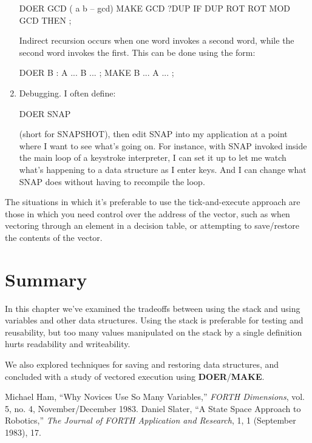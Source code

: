\begin{enumerate}
\begin{Code}
DOER GCD ( a b -- gcd)
MAKE GCD  ?DUP  IF  DUP ROT ROT  MOD  GCD  THEN ;
\end{Code}
Indirect recursion occurs when one word invokes a second word, while the
second word invokes the first. This can be done using the form:

\begin{Code}
DOER B
: A  ... B ... ;
MAKE B  ... A ... ;
\end{Code}
\item Debugging. I often define:

\begin{Code}
DOER SNAP
\end{Code}
(short for SNAPSHOT), then edit SNAP into my application at a point
where I want to see what's going on. For instance, with SNAP invoked inside
the main loop of a keystroke interpreter, I can set it up to let me watch
what's happening to a data structure as I enter keys. And I can change
what SNAP does without having to recompile the loop.
\end{enumerate}


The situations in which it's preferable to use the tick-and-execute approach
are those in which you need control over the address of the vector,
such as when vectoring through an element in a decision table, or
attempting to save/restore the contents of the vector.

\section{Summary}
In this chapter we've examined the tradeoffs between using the stack
and using variables and other data structures. Using the stack is
preferable for testing and reusability, but too many values manipulated
on the stack by a single definition hurts readability and writeability.

We also explored techniques for saving and restoring data structures,
and concluded with a study of vectored execution using \textbf{DOER}/\textbf{MAKE}.

\begin{references}{9}
 Michael Ham, ``Why Novices Use So Many Variables,''
   \emph{FORTH Dimensions}, vol. 5, no. 4, November/December 1983.
 Daniel Slater, ``A State Space Approach to
   Robotics,'' \emph{The Journal of FORTH Application and Research},
   1, 1 (September 1983), 17.
\end{references}

